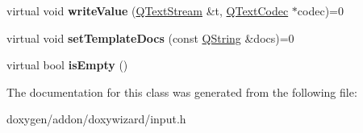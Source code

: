 \begin{DoxyCompactItemize}
\mbox{\label{class_input_a761f73fb00d6e0e3e391edafcfde1134}} 
virtual void {\bfseries write\+Value} (\mbox{\hyperlink{class_q_text_stream}{Q\+Text\+Stream}} \&t, \mbox{\hyperlink{class_q_text_codec}{Q\+Text\+Codec}} $\ast$codec)=0
\item 
\mbox{\label{class_input_a88188054c6f323aa45226c91101850d9}} 
virtual void {\bfseries set\+Template\+Docs} (const \mbox{\hyperlink{class_q_string}{Q\+String}} \&docs)=0
\item 
\mbox{\label{class_input_ad833c82a8e57bb915f035471dfdcda77}} 
virtual bool {\bfseries is\+Empty} ()
\end{DoxyCompactItemize}


The documentation for this class was generated from the following file\+:\begin{DoxyCompactItemize}
\item 
doxygen/addon/doxywizard/input.\+h\end{DoxyCompactItemize}
